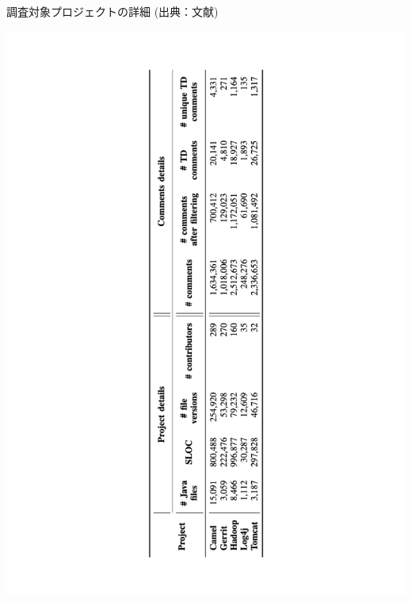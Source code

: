 \begin{table}[t]
    \centering
    \caption{調査対象プロジェクトの詳細 (出典：文献\cite{satd-removal})}
    \includegraphics[height=0.9\linewidth, angle=270]{./thesis1/data-table1.pdf}
    \label{fig:1_data-table}
\end{table}







